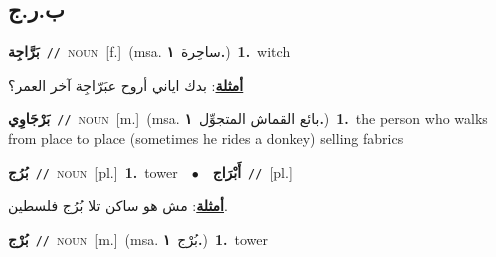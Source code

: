 \documentclass[10pt,a4paper,twoside]{article} %
\begin{document}
\begin{multicols}{2}
\vspace{-3mm}
\subsection*{\color{blue}\foreignlanguage{arabic}{ب.ر.ج}\color{blue}{}} 

{\setlength\topsep{0pt}\textbf{\foreignlanguage{arabic}{بَرَّاجِة}}\ {\color{gray}\texttt{//}\color{black}}\ \textsc{noun}\ [f.]\ \color{gray}(msa. \foreignlanguage{arabic}{ساحِرة}~\foreignlanguage{arabic}{\textbf{١.}})\color{black}\ \textbf{1.}~witch\  \begin{flushright}\color{gray}\foreignlanguage{arabic}{\textbf{\underline{\foreignlanguage{arabic}{أمثلة}}}: بدك اياني أروح عبَرّاجِة آخر العمر؟}\end{flushright}\color{black}} \vspace{2mm}

{\setlength\topsep{0pt}\textbf{\foreignlanguage{arabic}{بَرْجَاوِي}}\ {\color{gray}\texttt{//}\color{black}}\ \textsc{noun}\ [m.]\ \color{gray}(msa. \foreignlanguage{arabic}{بائع القماش المتجوِّل}~\foreignlanguage{arabic}{\textbf{١.}})\color{black}\ \textbf{1.}~the person who walks from place to place (sometimes he rides a donkey) selling fabrics\ } \vspace{2mm}

{\setlength\topsep{0pt}\textbf{\foreignlanguage{arabic}{بُرُج}}\ {\color{gray}\texttt{//}\color{black}}\ \textsc{noun}\ [pl.]\ \textbf{1.}~tower\ \ $\bullet$\ \ \setlength\topsep{0pt}\textbf{\foreignlanguage{arabic}{أَبْرَاج}}\ {\color{gray}\texttt{//}\color{black}}\ [pl.]\  \begin{flushright}\color{gray}\foreignlanguage{arabic}{\textbf{\underline{\foreignlanguage{arabic}{أمثلة}}}: مش هو ساكن تلا بُرُج فلسطين.}\end{flushright}\color{black}} \vspace{2mm}

{\setlength\topsep{0pt}\textbf{\foreignlanguage{arabic}{بُرْج}}\ {\color{gray}\texttt{//}\color{black}}\ \textsc{noun}\ [m.]\ \color{gray}(msa. \foreignlanguage{arabic}{بُرْج}~\foreignlanguage{arabic}{\textbf{١.}})\color{black}\ \textbf{1.}~tower\ } \vspace{2mm}


\end{multicols}
\end{document}
